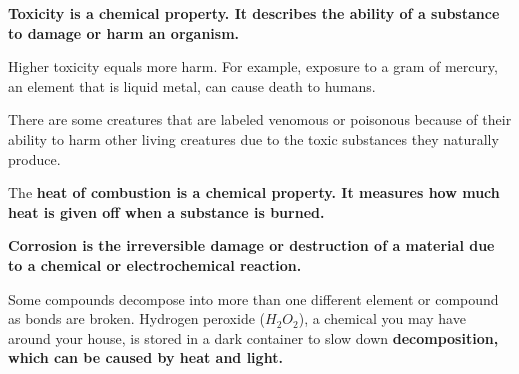 \begin{definition}[Toxicity]
    \bf{Toxicity} is a chemical property. It describes the ability of a
    substance to damage or harm an organism.
    
    Higher toxicity equals more harm. For example, exposure to a gram of mercury,
    an element that is liquid metal, can cause death to humans.
    
    There are some creatures that are labeled venomous or poisonous because of
    their ability to harm other living creatures due to the toxic substances they
    naturally produce.
\end{definition}

\begin{definition}
    The \bf{heat of combustion} is a chemical property. It measures how much
    heat is given off when a substance is burned.
\end{definition}

\begin{definition}[Corrosion]
    \bf{Corrosion} is the irreversible damage or destruction of a material
    due to a chemical or electrochemical reaction.
\end{definition}

\begin{definition}[Decomposition]
    Some compounds decompose into more than one different element or compound as
    bonds are broken. Hydrogen peroxide ($H_2O_2$), a chemical you may have
    around your house, is stored in a dark container to slow down
    \bf{decomposition}, which can be caused by heat and light.
\end{definition}

\newpage
